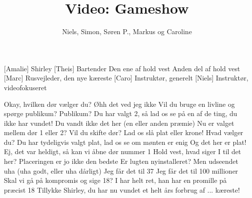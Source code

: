 \documentclass[a4paper,11pt]{article}
\title{Video: Gameshow}
\author{Niels, Simon, Søren P., Markus og Caroline}
\begin{document}
\maketitle

\begin{roles}
  [Amalie] Shirley
  [Theis] Bartender
   Den ene af hold vest
   Anden del af hold vest
  [Marc] Rusvejleder, den nye kæreste
  [Caro] Instruktør, generelt
  [Niels] Instruktør, videofokuseret
\end{roles}



\begin{sketch}
   Okay, hvilken dør vælger du?
   Øhh det ved jeg ikke
   Vil du bruge en livline og spørge publikum?
   Publikum?
   Du har valgt 2, så lad os se på en af de ting, du ikke har vundet!
   Du vandt ikke det her (en eller anden præmie)
   Nu er valget mellem dør 1 eller 2?
   Vil du skifte dør? Lad os slå plat eller krone!
   Hvad vælger du?
   Du har tydeligvis valgt plat, lad os se om mønten er enig
   Og det her er plat!
   Ej, det var heldigt, så kan vi åbne dør nummer 1
   Hold vest, hvad siger I til det her?
   Placeringen er jo ikke den bedste
   Er lugten nyinstalleret?
   Men udseendet uha (uha godt, eller uha dårligt)
   Jeg får det til 37
   Jeg får det til 100 millioner
   Skal vi gå på kompromis og sige 18?
   I har helt ret, han har en promille på præcist 18
   Tillykke Shirley, du har nu vundet et helt års forbrug af ... kæreste!


\end{sketch}
\end{document}
